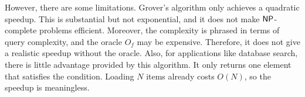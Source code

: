 \documentclass[a4paper,draft]{article}
\begin{document}
However, there are some limitations. Grover's algorithm only achieves a
quadratic speedup. This is substantial but not exponential, and it does
not make $\operatorname{\mathsf{NP}}$-complete problems efficient. Moreover, the complexity is
phrased in terms of query complexity, and the oracle $O_f$ may be
expensive. Therefore, it does not give a realistic speedup without the
oracle. Also, for applications like database search, there is little
advantage provided by this algorithm. It only returns one element that
satisfies the condition. Loading $N$ items already costs $O(N)$, so the
speedup is meaningless.
\end{document}
